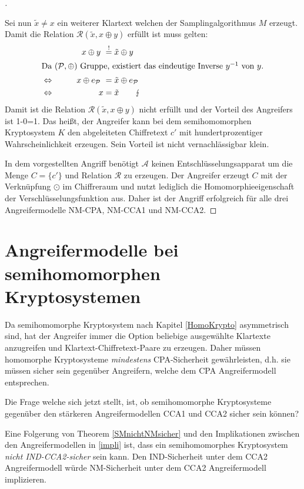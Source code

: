 \begin{proof}[]
\begin{enumerate}
	Sei nun $\tilde{x}\neq x$ ein weiterer Klartext welchen der Samplingalgorithmus $M$ erzeugt. Damit die Relation $\mathcal{R}(\tilde{x},x\oplus y)$ erfüllt ist muss gelten:	
   \begin{alignat*}{2}
    & & x\oplus y\ &\stackrel{!}{=} \tilde{x}\oplus y\\
    \intertext{Da $(\mathcal{P},\oplus)$ Gruppe, existiert das eindeutige Inverse $y^{-1}$ von $y$.}
    &\Leftrightarrow\qquad & x\oplus e_\mathcal{P}\ &= \tilde{x}\oplus e_\mathcal{P}\\
    &\Leftrightarrow\qquad & x &= \tilde{x} \qquad \lightning\\
	\end{alignat*}	
	Damit ist die Relation $\mathcal{R}(\tilde{x},x\oplus y)$ nicht erfüllt und der Vorteil des Angreifers ist 1-0=1. Das heißt, der Angreifer kann bei dem semihomomorphen Kryptosystem $K$ den abgeleiteten Chiffretext $c'$ mit hundertprozentiger Wahrscheinlichkeit erzeugen. Sein Vorteil ist nicht vernachlässigbar klein.
 \end{enumerate}
 In dem vorgestellten Angriff benötigt $\mathcal{A}$ keinen Entschlüsselungsapparat um die Menge $C=\{c'\}$ und Relation $\mathcal{R}$ zu erzeugen. Der Angreifer erzeugt $C$ mit der Verknüpfung $\odot$ im Chiffreraum und nutzt lediglich die Homomorphieeigenschaft der Verschlüsselungsfunktion aus. Daher ist der Angriff erfolgreich für alle drei Angreifermodelle NM-CPA, NM-CCA1 und NM-CCA2.
\end{proof}

\section{Angreifermodelle bei semihomomorphen Kryptosystemen}

Da semihomomorphe Kryptosystem nach Kapitel \ref{HomoKrypto} asymmetrisch sind, hat der Angreifer immer die Option beliebige ausgewählte Klartexte anzugreifen und Klartext-Chiffretext-Paare zu erzeugen. Daher müssen homomorphe Kryptosysteme \textit{mindestens} CPA-Sicherheit gewährleisten, d.h. sie müssen sicher sein gegenüber Angreifern, welche dem CPA Angreifermodell entsprechen. 

Die Frage welche sich jetzt stellt, ist, ob semihomomorphe Kryptosysteme gegenüber den stärkeren Angreifermodellen CCA1 und CCA2 sicher sein können? 

Eine Folgerung von Theorem \ref{SMnichtNMsicher} und den Implikationen zwischen den Angreifermodellen in \ref{impli} ist, dass ein semihomomorphes Kryptosystem \textit{nicht IND-CCA2-sicher} sein kann. Den IND-Sicherheit unter dem CCA2 Angreifermodell würde NM-Sicherheit unter dem CCA2 Angreifermodell implizieren.

